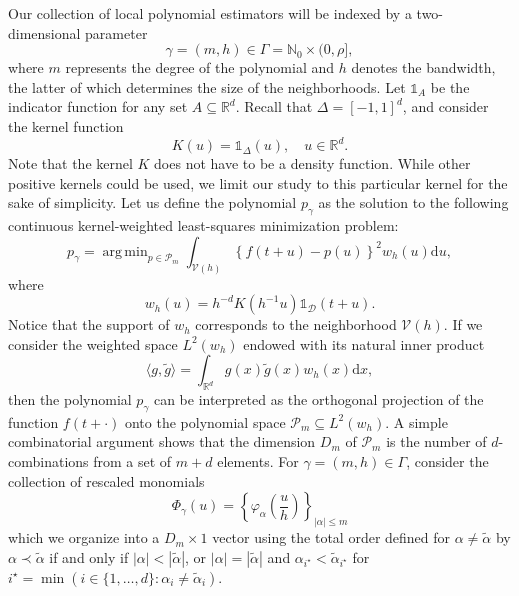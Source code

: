 \documentclass[bj,authoryear]{imsart}
\numberwithin{equation}{section}
\theoremstyle{plain}
\theoremstyle{remark}
\newcommand{\N}{\mathbb{N}}
\newcommand{\R}{\mathbb{R}}
\newcommand{\1}{\mathds{1}}
\newcommand{\rd}{\mathrm{d}}
\newcommand{\domain}{\mathcal{D}}
\newcommand{\voisin}{\mathcal{V}}
\begin{document}
    Our collection of local polynomial estimators will be indexed by a two-dimensional parameter
    \begin{equation*}
        \gamma = (m,h)\in \Gamma = \N_0\times (0,\rho],
    \end{equation*}
    where $m$ represents the degree of the polynomial and $h$ denotes the bandwidth, the latter of which determines the size of the neighborhoods.
    Let $\1_A$ be the indicator function for any set $A\subseteq \R^d$.
    Recall that $\Delta = [-1,1]^d$, and consider the kernel function
    \begin{equation}\label{eq:K}
        K(u) = \1_{\Delta}(u), \quad u\in \R^d.
    \end{equation}
    Note that the kernel $K$ does not have to be a density function. While other positive kernels could be used, we limit our study to this particular kernel for the sake of simplicity. Let us define the polynomial $p_{\gamma}$ as the solution to the following continuous kernel-weighted least-squares minimization problem:
    \begin{equation*}
        p_{\gamma} = \mathop{\mathrm{arg\,min}}_{p\in \mathcal{P}_{\!m}} \int_{\voisin(h)} \left\{f(t+u) - p(u)\right\}^2 w_h(u) \rd u,
    \end{equation*}
    where
    \begin{equation}\label{eq:w.h}
        w_h(u) = h^{-d} K(h^{-1} u) \1_{\domain}(t + u).
    \end{equation}
    Notice that the support of $w_h$ corresponds to the neighborhood $\voisin(h)$.
    If we consider the weighted space $L^2(w_h)$ endowed with its natural inner product
    \begin{equation*}
        \langle g,\tilde{g} \rangle =\int_{\R^d} g(x) \tilde{g}(x) w_h(x) \rd x,
    \end{equation*}
    then the polynomial $p_{\gamma}$ can be interpreted as the orthogonal projection of the function $f(t+\cdot)$ onto the polynomial space $\mathcal{P}_{\!m}\subseteq L^2(w_h)$.
    A simple combinatorial argument shows that the dimension $D_m$ of $\mathcal{P}_{\!m}$ is the number of $d$-combinations from a set of $m+d$ elements. For $\gamma=(m,h)\in \Gamma$, consider the collection of rescaled monomials
    \begin{equation*}
        \Phi_{\gamma}(u) = \left\{\varphi_{\alpha}\left(\frac{u}{h}\right)\right\}_{|\alpha|\leq m}
    \end{equation*}
    which we organize into a $D_m\times 1$ vector using the total order defined for $\alpha \neq \tilde{\alpha}$ by $\alpha \prec \tilde{\alpha}$ if and only if $|\alpha| < |\tilde{\alpha}|$, or $|\alpha|=|\tilde\alpha|$ and $\alpha_{i^{\star}} < \tilde{\alpha}_{i^{\star}}$ for $i^{\star} = \min(i\in \{1,\ldots,d\} : \alpha_i \neq \tilde{\alpha}_i)$.
\end{document}
